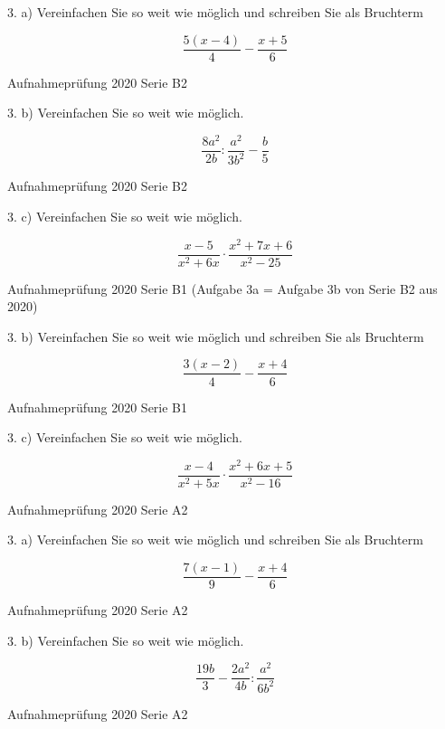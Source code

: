 {3. a) Vereinfachen Sie so weit wie möglich und schreiben Sie als Bruchterm

$$\frac{5(x-4)}{4} - \frac{x+5}{6}$$

Aufnahmeprüfung 2020 Serie B2

3. b) Vereinfachen Sie so weit wie möglich.

$$\frac{8a^2}{2b} : \frac{a^2}{3b^2} - \frac{b}{5}$$

Aufnahmeprüfung 2020 Serie B2

3. c) Vereinfachen Sie so weit wie möglich.

$$\frac{x-5}{x^2+6x} \cdot{} \frac{x^2+7x+6}{x^2-25}$$

Aufnahmeprüfung 2020 Serie B1
(Aufgabe 3a = Aufgabe 3b von Serie B2 aus 2020)

3. b) Vereinfachen Sie so weit wie möglich und schreiben Sie als Bruchterm

$$\frac{3(x-2)}{4} - \frac{x+4}{6}$$

Aufnahmeprüfung 2020 Serie B1

3. c) Vereinfachen Sie so weit wie möglich.

$$\frac{x-4}{x^2+5x} \cdot{} \frac{x^2+6x+5}{x^2-16}$$

Aufnahmeprüfung 2020 Serie A2

3. a) Vereinfachen Sie so weit wie möglich und schreiben Sie als Bruchterm

$$\frac{7(x-1)}{9} - \frac{x+4}{6}$$

Aufnahmeprüfung 2020 Serie A2

3. b) Vereinfachen Sie so weit wie möglich.

$$\frac{19b}{3} - \frac{2a^2}{4b} : \frac{a^2}{6b^2}$$

Aufnahmeprüfung 2020 Serie A2

}
